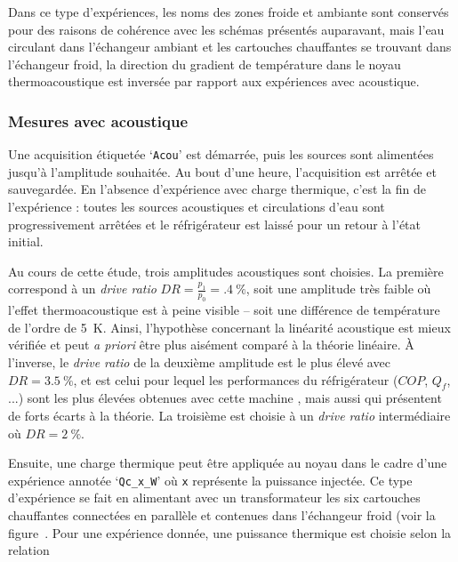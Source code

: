 Dans ce type d'expériences, les noms des zones \og froide \fg{} et \og ambiante \fg{} sont conservés pour des raisons de cohérence avec les schémas présentés auparavant, mais l'eau circulant dans l'échangeur ambiant et les cartouches chauffantes se trouvant dans l'échangeur froid, la direction du gradient de température dans le noyau thermoacoustique est inversée par rapport aux expériences avec acoustique. %


\subsubsection{Mesures avec acoustique}\label{chap:MesureAvecAcou} 
Une acquisition étiquetée `\texttt{Acou}' est démarrée, puis les sources sont alimentées jusqu'à l'amplitude souhaitée. Au bout d'une heure, l'acquisition est arrêtée et sauvegardée. En l'absence d'expérience avec charge thermique, c'est la fin de l'expérience : toutes les sources acoustiques et circulations d'eau sont progressivement arrêtées et le réfrigérateur est laissé pour un retour à l'état initial.

Au cours de cette étude, trois amplitudes acoustiques sont choisies. La première correspond à un \textit{drive ratio} $DR=\frac{p_1}{p_0}=\qty{.4}{\percent}$, soit une amplitude très faible où l'effet thermoacoustique est à peine visible -- soit une différence de température de l'ordre de \qty{5}{\kelvin}. Ainsi, l'hypothèse concernant la linéarité acoustique est mieux vérifiée et peut \textit{a priori} être plus aisément comparé à la théorie linéaire. À l'inverse, le \textit{drive ratio} de la deuxième amplitude est le plus élevé avec $DR=\qty{3.5}{\percent}$, et est celui pour lequel les performances du réfrigérateur ($COP$, $Q_f$, ...) sont les plus élevées obtenues avec cette machine \cite{ramadan_design_2021}, mais aussi qui présentent de forts écarts à la théorie. La troisième est choisie à un \textit{drive ratio} intermédiaire où $DR=\qty{2}{\percent}$. \medskip

Ensuite, une charge thermique peut être appliquée au noyau dans le cadre d'une expérience annotée `\texttt{Qc\_x\_W}' où \texttt{x} représente la puissance injectée. Ce type d'expérience se fait en alimentant avec un transformateur les six cartouches chauffantes connectées en parallèle et contenues dans l'échangeur froid (voir la figure~. Pour une expérience donnée, une puissance thermique est choisie selon la relation

